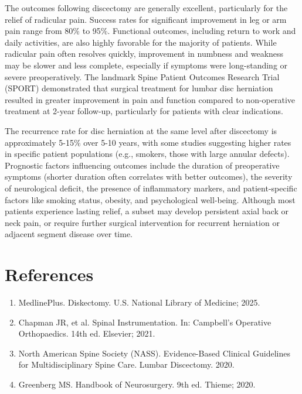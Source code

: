 The outcomes following discectomy are generally excellent, particularly for the relief of radicular pain. Success rates for significant improvement in leg or arm pain range from 80\% to 95\%. Functional outcomes, including return to work and daily activities, are also highly favorable for the majority of patients. While radicular pain often resolves quickly, improvement in numbness and weakness may be slower and less complete, especially if symptoms were long-standing or severe preoperatively. The landmark Spine Patient Outcomes Research Trial (SPORT) demonstrated that surgical treatment for lumbar disc herniation resulted in greater improvement in pain and function compared to non-operative treatment at 2-year follow-up, particularly for patients with clear indications.

The recurrence rate for disc herniation at the same level after discectomy is approximately 5-15\% over 5-10 years, with some studies suggesting higher rates in specific patient populations (e.g., smokers, those with large annular defects). Prognostic factors influencing outcomes include the duration of preoperative symptoms (shorter duration often correlates with better outcomes), the severity of neurological deficit, the presence of inflammatory markers, and patient-specific factors like smoking status, obesity, and psychological well-being. Although most patients experience lasting relief, a subset may develop persistent axial back or neck pain, or require further surgical intervention for recurrent herniation or adjacent segment disease over time.

\section*{References}
\begin{enumerate}
  \item MedlinePlus. Diskectomy. U.S. National Library of Medicine; 2025.
  \item Chapman JR, et al. Spinal Instrumentation. In: Campbell's Operative Orthopaedics. 14th ed. Elsevier; 2021.
  \item North American Spine Society (NASS). Evidence-Based Clinical Guidelines for Multidisciplinary Spine Care. Lumbar Discectomy. 2020.
  \item Greenberg MS. Handbook of Neurosurgery. 9th ed. Thieme; 2020.
\end{enumerate}

\clearpage
